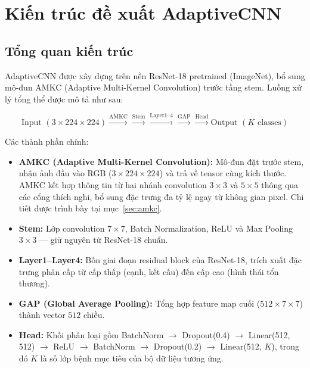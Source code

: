 \section{Kiến trúc đề xuất AdaptiveCNN}
\label{sec:kien-truc-adaptivecnn}

\subsection{Tổng quan kiến trúc}

AdaptiveCNN được xây dựng trên nền ResNet-18 pretrained (ImageNet), bổ sung mô-đun AMKC (Adaptive Multi-Kernel Convolution) trước tầng stem. Luồng xử lý tổng thể được mô tả như sau:

\begin{equation}
  \text{Input } (3 \times 224 \times 224) \xrightarrow{\text{AMKC}} \xrightarrow{\text{Stem}} \xrightarrow{\text{Layer1--4}} \xrightarrow{\text{GAP}} \xrightarrow{\text{Head}} \text{Output } (K \text{ classes})
\end{equation}

Các thành phần chính:
\begin{itemize}
  \item \textbf{AMKC (Adaptive Multi-Kernel Convolution):} Mô-đun đặt trước stem, nhận ảnh đầu vào RGB ($3\times224\times224$) và trả về tensor cùng kích thước. AMKC kết hợp thông tin từ hai nhánh convolution $3\times3$ và $5\times5$ thông qua các cổng thích nghi, bổ sung đặc trưng đa tỷ lệ ngay từ không gian pixel. Chi tiết được trình bày tại mục~\ref{sec:amkc}.
  \item \textbf{Stem:} Lớp convolution $7\times7$, Batch Normalization, ReLU và Max Pooling $3\times3$ --- giữ nguyên từ ResNet-18 chuẩn.
  \item \textbf{Layer1--Layer4:} Bốn giai đoạn residual block của ResNet-18, trích xuất đặc trưng phân cấp từ cấp thấp (cạnh, kết cấu) đến cấp cao (hình thái tổn thương).
  \item \textbf{GAP (Global Average Pooling):} Tổng hợp feature map cuối ($512\times7\times7$) thành vector $512$ chiều.
  \item \textbf{Head:} Khối phân loại gồm BatchNorm $\rightarrow$ Dropout(0.4) $\rightarrow$ Linear(512, 512) $\rightarrow$ ReLU $\rightarrow$ BatchNorm $\rightarrow$ Dropout(0.2) $\rightarrow$ Linear(512, $K$), trong đó $K$ là số lớp bệnh mục tiêu của bộ dữ liệu tương ứng.
\end{itemize}

